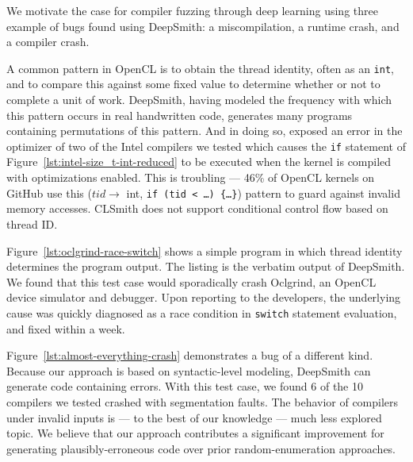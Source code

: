 
We motivate the case for compiler fuzzing through deep learning using three example of bugs found using DeepSmith: a miscompilation, a runtime crash, and a compiler crash.

A common pattern in OpenCL is to obtain the thread identity, often as an \texttt{int}, and to compare this against some fixed value to determine whether or not to complete a unit of work. DeepSmith, having modeled the frequency with which this pattern occurs in real handwritten code, generates many programs containing permutations of this pattern. And in doing so, exposed an error in the optimizer of two of the Intel compilers we tested
which causes the \texttt{if} statement of Figure~\ref{lst:intel-size_t-int-reduced} to be executed when the kernel is compiled with optimizations enabled.
%
This is troubling --- 46\% of OpenCL kernels on GitHub use this ($tid \rightarrow$ int, \texttt{if (tid < \ldots) \{\ldots\}}) pattern to guard against invalid memory accesses. CLSmith does not support conditional control flow based on thread ID. %

Figure~\ref{lst:oclgrind-race-switch} shows a simple program in which thread identity determines the program output. The listing is the verbatim output of DeepSmith. We found that this test case would sporadically crash Oclgrind, an OpenCL device simulator and debugger. Upon reporting to the developers, the underlying cause was quickly diagnosed as a race condition in \texttt{switch} statement evaluation, and fixed within a week.

Figure~\ref{lst:almost-everything-crash} demonstrates a bug of a different kind. Because our approach is based on syntactic-level modeling, DeepSmith can generate code containing errors. With this test case, we found 6 of the 10 compilers we tested crashed with segmentation faults. The behavior of compilers under invalid inputs is --- to the best of our knowledge --- much less explored topic. We believe that our approach contributes a significant improvement for generating plausibly-erroneous code over prior random-enumeration approaches.
